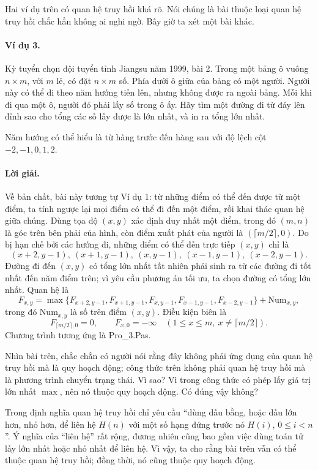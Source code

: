 \documentclass[11pt]{article}
\begin{document}
Hai ví dụ trên có quan hệ truy hồi khá rõ. Nói chúng là bài thuộc loại quan
hệ truy hồi chắc hẳn không ai nghi ngờ. Bây giờ ta xét một bài khác.

\paragraph{Ví dụ 3.}
Kỳ tuyển chọn đội tuyển tỉnh Jiangsu năm 1999, bài 2. Trong một bảng ô vuông
\(n\times m\), với \(m\) lẻ, có đặt \(n\times m\) số. Phía dưới ô giữa của
bảng có một người. Người này có thể đi theo năm hướng tiến lên, nhưng không
được ra ngoài bảng. Mỗi khi đi qua một ô, người đó phải lấy số trong ô ấy.
Hãy tìm một đường đi từ đáy lên đỉnh sao cho tổng các số lấy được là lớn
nhất, và in ra tổng lớn nhất.

Năm hướng có thể hiểu là từ hàng trước đến hàng sau với độ lệch cột
\(-2,-1,0,1,2\).

\paragraph{Lời giải.}
Về bản chất, bài này tương tự Ví dụ 1: từ những điểm có thể đến được từ một
điểm, ta tính ngược lại mọi điểm có thể đi đến một điểm, rồi khai thác quan
hệ giữa chúng. Dùng tọa độ \((x,y)\) xác định duy nhất một điểm, trong đó
\((m,n)\) là góc trên bên phải của hình, còn điểm xuất phát của người là
\((\lceil m/2\rceil,0)\). Do bị hạn chế bởi các hướng đi, những điểm có thể
đến trực tiếp \((x,y)\) chỉ là
\[
  (x+2,y-1),\ (x+1,y-1),\ (x,y-1),\ (x-1,y-1),\ (x-2,y-1).
\]
Đường đi đến \((x,y)\) có tổng lớn nhất tất nhiên phải sinh ra từ các đường
đi tốt nhất đến năm điểm trên; vì yêu cầu phương án tối ưu, ta chọn đường có
tổng lớn nhất. Quan hệ là
\[
  F_{x,y}=
  \max\{F_{x+2,y-1},F_{x+1,y-1},F_{x,y-1},
       F_{x-1,y-1},F_{x-2,y-1}\}+\mathrm{Num}_{x,y},
\]
trong đó \(\mathrm{Num}_{x,y}\) là số trên điểm \((x,y)\). Điều kiện biên là
\[
  F_{\lceil m/2\rceil,0}=0,\qquad
  F_{x,0}=-\infty\quad
  (1\le x\le m,\ x\ne\lceil m/2\rceil).
\]
Chương trình tương ứng là Pro\_3.Pas.

Nhìn bài trên, chắc chắn có người nói rằng đây không phải ứng dụng của quan
hệ truy hồi mà là quy hoạch động; công thức trên không phải quan hệ truy hồi
mà là phương trình chuyển trạng thái. Vì sao? Vì trong công thức có phép lấy
giá trị lớn nhất \(\max\), nên nó thuộc quy hoạch động. Có đúng vậy không?

Trong định nghĩa quan hệ truy hồi chỉ yêu cầu ``dùng dấu bằng, hoặc dấu lớn
hơn, nhỏ hơn, để liên hệ \(H(n)\) với một số hạng đứng trước nó \(H(i)\),
\(0\le i<n\)''. Ý nghĩa của ``liên hệ'' rất rộng, đương nhiên cũng bao gồm
việc dùng toán tử lấy lớn nhất hoặc nhỏ nhất để liên hệ. Vì vậy, ta cho rằng
bài trên vẫn có thể thuộc quan hệ truy hồi; đồng thời, nó cũng thuộc quy
hoạch động.
\end{document}
